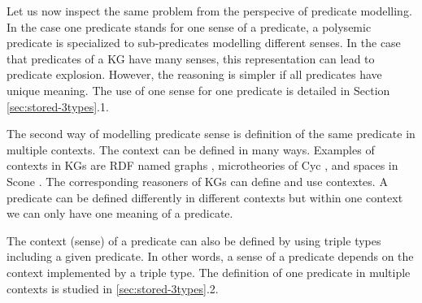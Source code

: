 \documentclass[runningheads]{llncs}
\newcommand{\memo}[1]{}
\newcommand{\notes}[1]{\noindent\begin{small}-- \emph{#1}\hfill\break\end{small}}
\begin{document}
\memo{
However, we often need a semantics of a predicate that allows the
definition of a predicate with multiple senses, depending on the
context of the predicate. One reason for adding $\lor$-types to a KG
can be the expressive power of KG. These KGs use owl:unionOf and
owl:intersectionOf to define more complex types of predicates.
Examples of such KGs are schema.org, EPCIS, DBpedia (in few cases) and
model transformation tools. Further, KGs that can define contexts and
use contextual reasoning also use $\land$ and $\lor$-types. The
contexts are often defined by RDF named graphs, e.g., DBpedia
\cite{Auer2007} and Linked Data \cite{ld-site}. Examples of KGs that
can define and use contexts are Cyc \cite{cyc}, Scone
\cite{Fahlman2011} and RACER \cite{Haarslev2012}.}

Let us now inspect the same problem from the perspecive of predicate
modelling. In the case one predicate stands for one sense of a
predicate, a polysemic predicate is specialized to sub-predicates
modelling different senses. In the case that predicates of a KG have
many senses, this representation can lead to predicate
explosion. However, the reasoning is simpler if all predicates have
unique meaning. %
The use of one sense for one predicate is detailed in Section
\ref{sec:stored-3types}.1.

The second way of modelling predicate sense is definition of the same
predicate in multiple contexts. The context can be defined in many
ways. Examples of contexts in KGs are RDF named graphs
\cite{Carroll2005}, microtheories of Cyc \cite{cyc}, and spaces in
Scone \cite{Fahlman2011}. The corresponding reasoners of KGs can
define and use contextes. A predicate can be defined differently in
different contexts but within one context we can only have one meaning
of a predicate.

The context (sense) of a predicate can also be defined by using triple
types including a given predicate. In other words, a sense of a
predicate depends on the context implemented by a triple type. The
definition of one predicate in multiple contexts is studied in
\ref{sec:stored-3types}.2.

\memo{
\notes{Whitin an ontology it seems that the triple type can be used, quite naturally, as the context of a predicate.}
\notes{The meaning of predicate is modelled by a triple type including concrete classes, types of domains and ranges.}
\notes{We have one triple type (predicate and types of S and O) mapped to one meaning.}
\notes{The representation requires using contextual reasoning \cite{cyc}.}
\notes{One of the pros is that contextual representation and reasoning is close to the natural language \cite{Fahlman2011}.}
\notes{Pitfalls of word sense disambiguation and contextual reasoning....}}
\end{document}
